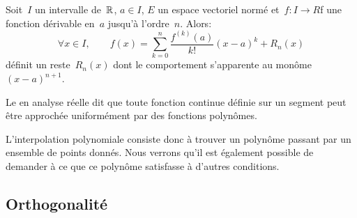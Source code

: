 \begin{theoreme}\label{Th-Taylor}
Soit~$I$ un intervalle de~$\mathbb R$, $a\in I$, $E$ un espace vectoriel normé et~$f: I\rightarrow R$f une fonction dérivable en~$a$ 
jusqu’à l’ordre~$n$. Alors:
\begin{equation}
\forall x\in I, \qquad
f(x) =\sum_{k=0}^n \frac{f^{(k)}(a)}{k!}(x-a)^k + R_n(x)
\end{equation}
définit un reste~$R_n(x)$ dont le comportement s'apparente au monôme~$(x-a)^{n+1}$.
\end{theoreme}
\medskipvm
Le  en analyse réelle dit que toute fonction continue définie sur un segment peut être approchée uniformément par des fonctions polynômes. 

L'interpolation polynomiale consiste donc à trouver un polynôme passant par un ensemble de points donnés. Nous verrons qu'il est également possible de demander à ce que ce polynôme satisfasse à d'autres conditions.
 
\medskip
\subsection{Orthogonalité} 

